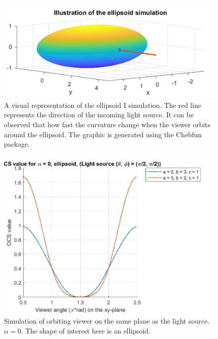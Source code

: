 \documentclass[11pt,reqno]{amsart}
\theoremstyle{definition}
\begin{document}
\begin{figure}[h]
\includegraphics[scale=0.35]{./figs/OCS_ellipsoid}
\caption{A visual representation of the ellipsoid I simulation. The red line represents the direction of the incoming light source. It can be observed that how fast the curvature change when the viewer orbits around the ellipsoid. The graphic is generated using the Chebfun package.}
\label{OCSEllipsoid}
\end{figure}

\begin{figure}[h]
\includegraphics[scale=0.35]{./figs/OCS_parallel_plane_ellipsoid}
\caption{Simulation of orbiting viewer on the same plane as the light source. $\alpha = 0$. The shape of interest here is an ellipsoid.}
\label{OCSParallelPlaneEllipsoid}
\end{figure}
\end{document}
